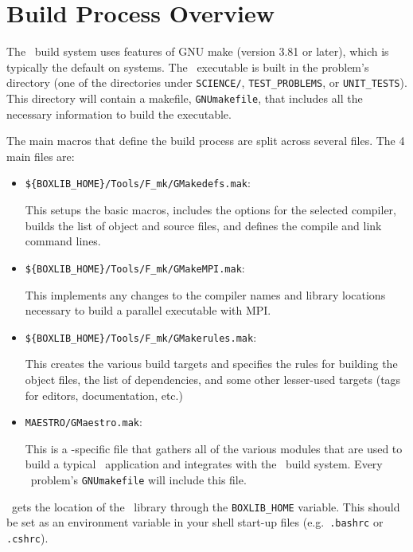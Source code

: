 \label{ch:make}

\section{Build Process Overview}

The \maestro\ build system uses features of GNU make (version 3.81 or
later), which is typically the default on systems.  The \maestro\
executable is built in the problem's directory (one of the directories
under {\tt SCIENCE/}, {\tt TEST\_PROBLEMS}, or {\tt UNIT\_TESTS}).  This
directory will contain a makefile, {\tt GNUmakefile}, that includes
all the necessary information to build the executable.

The main macros that define the build process are split across several
files.  The 4 main files are:
\begin{itemize}
\item {\tt \$\{BOXLIB\_HOME\}/Tools/F\_mk/GMakedefs.mak}:

  This setups the basic macros, includes the options for the selected
  compiler, builds the list of object and source files, and defines
  the compile and link command lines.

\item {\tt \$\{BOXLIB\_HOME\}/Tools/F\_mk/GMakeMPI.mak}:

  This implements any changes to the compiler names and library
  locations necessary to build a parallel executable with MPI.

\item {\tt \$\{BOXLIB\_HOME\}/Tools/F\_mk/GMakerules.mak}:

  This creates the various build targets and specifies the rules for
  building the object files, the list of dependencies, and some other
  lesser-used targets (tags for editors, documentation, etc.)

\item {\tt MAESTRO/GMaestro.mak}:

  This is a \maestro-specific file that gathers all of the various
  modules that are used to build a typical \maestro\ application
  and integrates with the \boxlib\ build system.  Every \maestro\
  problem's {\tt GNUmakefile} will include this file.

\end{itemize}

\maestro\ gets the location of the \boxlib\ library through the 
{\tt BOXLIB\_HOME} variable.  This should be set as an environment
variable in your shell start-up files (e.g.\ {\tt .bashrc} or {\tt
.cshrc}).

